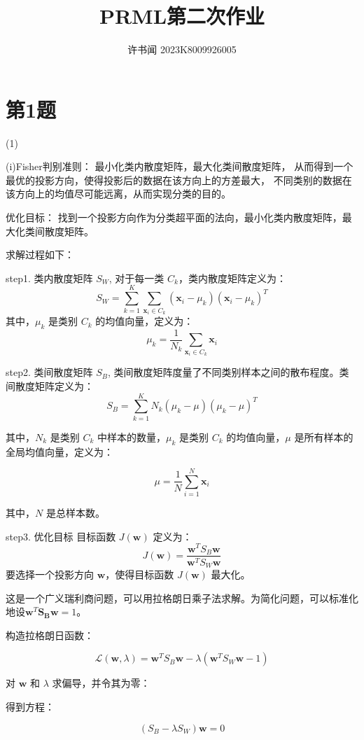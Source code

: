 \documentclass{article}
\begin{document}
\title{PRML第二次作业}
\author{许书闻 2023K8009926005}
\maketitle

\section*{第1题}
(1)

(i)Fisher判别准则：
最小化类内散度矩阵，最大化类间散度矩阵，
从而得到一个最优的投影方向，使得投影后的数据在该方向上的方差最大，
不同类别的数据在该方向上的均值尽可能远离，从而实现分类的目的。

优化目标：
找到一个投影方向作为分类超平面的法向，最小化类内散度矩阵，最大化类间散度矩阵。

求解过程如下：

step1. 类内散度矩阵 \( S_W \),
对于每一类 \( C_k \)，类内散度矩阵定义为：
\[
S_W = \sum_{k=1}^{K} \sum_{\mathbf{x}_i \in C_k} (\mathbf{x}_i - \mu_k)(\mathbf{x}_i - \mu_k)^T
\]
其中，\( \mu_k \) 是类别 \( C_k \) 的均值向量，定义为：
\[
\mu_k = \frac{1}{N_k} \sum_{\mathbf{x}_i \in C_k} \mathbf{x}_i
\]

step2. 类间散度矩阵 \( S_B \),
类间散度矩阵度量了不同类别样本之间的散布程度。类间散度矩阵定义为：
\[
S_B = \sum_{k=1}^{K} N_k (\mu_k - \mu)(\mu_k - \mu)^T
\]

其中，\( N_k \) 是类别 \( C_k \) 中样本的数量，\( \mu_k \) 是类别 \( C_k \) 的均值向量，\( \mu \) 是所有样本的全局均值向量，定义为：

\[
\mu = \frac{1}{N} \sum_{i=1}^{N} \mathbf{x}_i
\]

其中，\( N \) 是总样本数。

step3. 优化目标
目标函数 \( J(\mathbf{w}) \) 定义为：
\[
J(\mathbf{w}) = \frac{\mathbf{w}^T S_B \mathbf{w}}{\mathbf{w}^T S_W \mathbf{w}}
\]
要选择一个投影方向 \( \mathbf{w} \)，使得目标函数 \( J(\mathbf{w}) \) 最大化。

这是一个广义瑞利商问题，可以用拉格朗日乘子法求解。为简化问题，可以标准化地设\(\mathbf{w}^T \mathbf{S_B}\mathbf{w} = 1\)。

构造拉格朗日函数：

\[
\mathcal{L}(\mathbf{w}, \lambda) = \mathbf{w}^T S_B \mathbf{w} - \lambda (\mathbf{w}^T S_W \mathbf{w} - 1)
\]

对 \( \mathbf{w} \) 和 \( \lambda \) 求偏导，并令其为零：

得到方程：

\[
(S_B - \lambda S_W) \mathbf{w} = 0
\]
\end{document}
